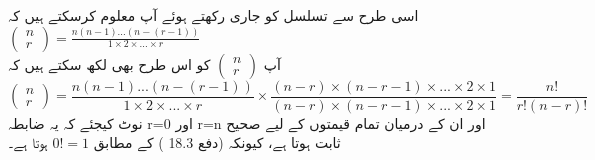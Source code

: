 اسی طرح سے تسلسل کو جاری رکھتے ہوئے آپ معلوم کرسکتے ہیں کہ 
      \(\begin{pmatrix}
     n\\r
     \end{pmatrix}
     =\frac{n(n-1)...(n-(r-1))}{1\times2\times...\times r}\)\\
آپ 
      \(\begin{pmatrix}
     n\\r
     \end{pmatrix}\)
  کو اس طرح بھی لکھ سکتے ہیں کہ 
   \[\begin{pmatrix}
     n\\r
     \end{pmatrix}
     =\frac{n(n-1)...(n-(r-1))}{1\times2\times...\times r}\times \frac{(n-r)\times(n-r-1)\times ...\times 2\times1}{(n-r)\times(n-r-1)\times...\times2\times1}=\frac{n!}{r!(n-r)!}\]
نوٹ کیجئے کہ یہ ضابطہ
r=0
  اور
r=n
  اور ان کے درمیان تمام قیمتوں کے لیے صحیح ثابت ہوتا ہے،
  کیونکہ  (دفع  
18.3
) کے مطابق  
\(0!=1\)
  ہوتا ہے۔

